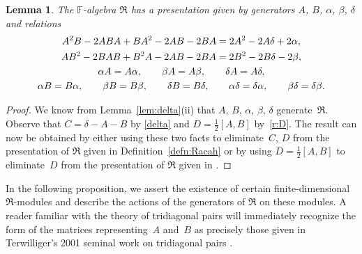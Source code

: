 \documentclass[pdftex]{sigma}
\def\F{\mathbb F}
\numberwithin{equation}{section}
\newtheorem{Lemma}[Theorem]{Lemma}
\begin{document}
\begin{Lemma}\label{lem:presentationR}The $\F$-algebra $\Re$ has a presentation given by generators $A$, $B$, $\alpha$, $\beta$, $\delta$ and relations
\begin{gather}
A^2 B-2 A B A+B A^2-2AB-2BA=2A^2-2A\delta +2\alpha,\label{AAB}\\
AB^2-2BAB+B^2 A-2 AB-2 BA= 2B^2-2B\delta-2\beta,\label{ABB}\\
\alpha A = A\alpha, \qquad\beta A = A\beta, \qquad\delta A = A\delta,\notag\\
\alpha B = B\alpha,\qquad\beta B = B\beta,\qquad\delta B = B\delta,\qquad
 \alpha \delta = \delta \alpha,\qquad \beta \delta = \delta \beta. \notag
\end{gather}
\end{Lemma}
\begin{proof}We know from Lemma~\ref{lem:delta}(ii) that $A$, $B$, $\alpha$, $\beta$, $\delta$ generate~$\Re$. Observe that $C=\delta-A-B$ by \eqref{delta} and $D=\frac{1}{2}[A,B]$ by~\eqref{r:D}. The result can now be obtained by either using these two facts to eliminate~$C$, $D$ from the presentation of $\Re$ given in Definition~\ref{defn:Racah} or by using $D=\frac{1}{2}[A,B]$ to eliminate~$D$ from the presentation of $\Re$ given in \cite[Proposition~3.4]{SH:2017-1}.
\end{proof}

In the following proposition, we assert the existence of certain finite-dimensional $\Re$-modules and describe the actions of the generators of $\Re$ on these modules. A reader familiar with the theory of tridiagonal pairs will immediately recognize the form of the matrices representing~$A$ and~$B$ as precisely those given in Terwilliger's 2001 seminal work on tridiagonal pairs \cite[Theorem~3.2]{lp2001}.
\end{document}
